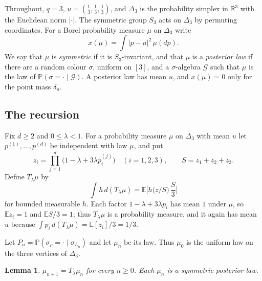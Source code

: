 \documentclass[11pt]{amsart}
\newtheorem{lemma}[theorem]{Lemma}
\theoremstyle{definition}
\theoremstyle{remark}
\newcommand{\E}{\mathbb{E}}
\newcommand{\PP}{\mathbb{P}}
\newcommand{\R}{\mathbb{R}}
\newcommand{\Simp}{\Delta_3}
\begin{document}
Throughout, $q=3$, $u=(\tfrac13,\tfrac13,\tfrac13)$, and $\Simp$ is the probability simplex in $\R^3$ with
the Euclidean norm $|\cdot|$. The symmetric group $S_3$ acts on $\Simp$ by permuting coordinates. For a
Borel probability measure $\mu$ on $\Simp$ write
\[
x(\mu)=\int|p-u|^2\,\mu(dp).
\]
We say that $\mu$ is \emph{symmetric} if it is $S_3$-invariant, and that $\mu$ is a \emph{posterior law} if
there are a random colour $\sigma$, uniform on $[3]$, and a $\sigma$-algebra $\mathcal G$ such that $\mu$ is
the law of $\PP(\sigma=\cdot\mid\mathcal G)$. A posterior law has mean $u$, and $x(\mu)=0$ only for the
point mass $\delta_u$.

\subsection{The recursion}
Fix $d\ge2$ and $0\le\lambda<1$. For a probability measure $\mu$ on $\Simp$ with mean $u$ let
$p^{(1)},\dots,p^{(d)}$ be independent with law $\mu$, and put
\[
z_i=\prod_{j=1}^d\big(1-\lambda+3\lambda p^{(j)}_i\big)\quad(i=1,2,3),\qquad S=z_1+z_2+z_3 .
\]
Define $T_\lambda\mu$ by
\begin{equation}\label{eq:T}
\int h\,d(T_\lambda\mu)=\E\Big[h\big(z/S\big)\,\frac S3\Big]
\end{equation}
for bounded measurable $h$. Each factor $1-\lambda+3\lambda p_i$ has mean $1$ under $\mu$, so $\E z_i=1$
and $\E S/3=1$; thus $T_\lambda\mu$ is a probability measure, and it again has mean $u$ because
$\int p_i\,d(T_\lambda\mu)=\E[z_i]/3=1/3$.

Let $P_n=\PP(\sigma_\rho=\cdot\mid\sigma_{L_n})$ and let $\mu_n$ be its law. Thus $\mu_0$ is the uniform law
on the three vertices of $\Simp$.

\begin{lemma}\label{lem:recursion}
$\mu_{n+1}=T_\lambda\mu_n$ for every $n\ge0$. Each $\mu_n$ is a symmetric posterior law.
\end{lemma}
\end{document}
